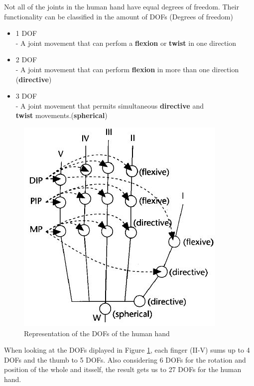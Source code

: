 Not all of the joints in the human hand have equal degrees of freedom. Their functionality can be classified in the amount of DOFs (Degrees of freedom)\cite{KOREIN.1985}
\begin{itemize}
\item 1 DOF \\
- A joint movement that can perfom a \textbf{flexion} or \textbf{twist} in one direction
\item 2 DOF \\
- A joint movement that can perform \textbf{flexion} in more than one direction\\ (\textbf{directive})
\item 3 DOF\\
- A joint movement that permits simultaneous \textbf{directive} and \\ \textbf{twist} movements.(\textbf{spherical})
\end{itemize}
\begin{figure}[H]
\includegraphics[scale=0.8]{images/Hand_DOFs.JPG} 
\caption{Representation of the DOFs of the human hand}
\label{dof_image} 
\end{figure}
When looking at the DOFs diplayed in Figure \ref{dof_image}, each finger (II-V) sums up to 4 DOFs and the thumb to 5 DOFs. Also considering 6 DOFs for the rotation and position of the whole and itsself, the result gets us to 27 DOFs  for the human hand.

